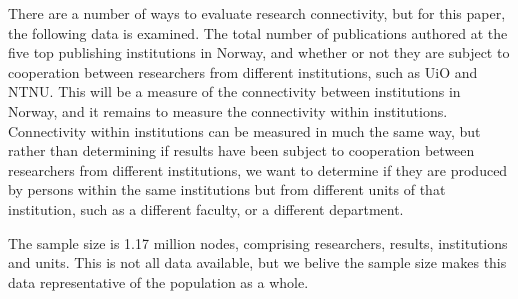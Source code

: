 There are a number of ways to evaluate research connectivity, but for this paper, the following data is examined.
The total number of publications authored at the five top publishing institutions in Norway, and whether or not they are subject to cooperation between researchers from different institutions, such as UiO and NTNU.
This will be a measure of the connectivity between institutions in Norway, and it remains to measure the connectivity within institutions.
Connectivity within institutions can be measured in much the same way, but rather than determining if results have been subject to cooperation between researchers from different institutions, we want to determine if they are produced by persons within the same institutions but from different units of that institution, such as a different faculty, or a different department.

The sample size is 1.17 million nodes, comprising researchers, results, institutions and units. This is not all data available, but we belive the sample size makes this data representative of the population as a whole.
